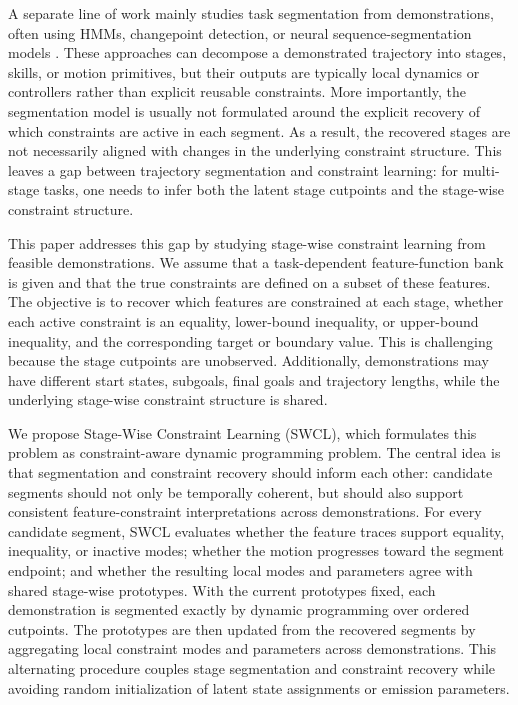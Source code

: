 \documentclass[lettersize,journal]{IEEEtran}
\begin{document}
A separate line of work mainly studies task segmentation from demonstrations, often using HMMs, changepoint detection, or neural sequence-segmentation models \cite{rabiner1989hmm,johnson2013hsmm,truong2020selective,aminikhanghahi2017survey,niekum2015grounded,medina2017stable,tanwani2016semi,shiarlis2018taco,kipf2019compile}. These approaches can decompose a demonstrated trajectory into stages, skills, or motion primitives, but their outputs are typically local dynamics or controllers rather than explicit reusable constraints. More importantly, the segmentation model is usually not formulated around the explicit recovery of which constraints are active in each segment. As a result, the recovered stages are not necessarily aligned with changes in the underlying constraint structure. This leaves a gap between trajectory segmentation and constraint learning: for multi-stage tasks, one needs to infer both the latent stage cutpoints and the stage-wise constraint structure.

This paper addresses this gap by studying stage-wise constraint learning from feasible demonstrations. We assume that a task-dependent feature-function bank is given and that the true constraints are defined on a subset of these features. The objective is to recover which features are constrained at each stage, whether each active constraint is an equality, lower-bound inequality, or upper-bound inequality, and the corresponding target or boundary value. This is challenging because the stage cutpoints are unobserved. Additionally, demonstrations may have different start states, subgoals, final goals and trajectory lengths, while the underlying stage-wise constraint structure is shared.

We propose Stage-Wise Constraint Learning (SWCL), which formulates this problem as constraint-aware dynamic programming problem. The central idea is that segmentation and constraint recovery should inform each other: candidate segments should not only be temporally coherent, but should also support consistent feature-constraint interpretations across demonstrations. For every candidate segment, SWCL evaluates whether the feature traces support equality, inequality, or inactive modes; whether the motion progresses toward the segment endpoint; and whether the resulting local modes and parameters agree with shared stage-wise prototypes. With the current prototypes fixed, each demonstration is segmented exactly by dynamic programming over ordered cutpoints. The prototypes are then updated from the recovered segments by aggregating local constraint modes and parameters across demonstrations. This alternating procedure couples stage segmentation and constraint recovery while avoiding random initialization of latent state assignments or emission parameters.
\end{document}
